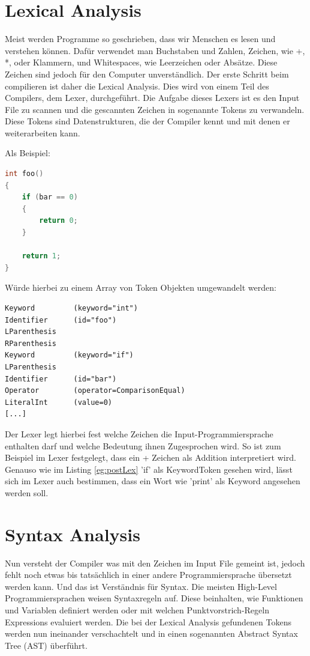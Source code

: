 \section{Lexical Analysis}
Meist werden Programme so geschrieben, dass wir Menschen es lesen und verstehen können. Dafür verwendet man Buchstaben und Zahlen, Zeichen, wie +, *, oder Klammern, und Whitespaces, wie Leerzeichen oder Absätze.
Diese Zeichen sind jedoch für den Computer unverständlich. Der erste Schritt beim compilieren ist daher die Lexical Analysis. Dies wird von einem Teil des Compilers, dem Lexer, durchgeführt.
Die Aufgabe dieses Lexers ist es den Input File zu scannen und die gescannten Zeichen in sogenannte Tokens zu verwandeln. Diese Tokens sind Datenstrukturen, die der Compiler kennt und mit denen er weiterarbeiten kann.

Als Beispiel:

\begin{lstlisting}[language=C, label=eg:preLex, caption=C code vor Lexical Analysis]
int foo()
{
    if (bar == 0)
    {
        return 0;
    }

    return 1;
}
\end{lstlisting}

Würde hierbei zu einem Array von Token Objekten umgewandelt werden:

\begin{lstlisting}[label=eg:postLex, caption=Tokens nach Lexical Analysis]
Keyword         (keyword="int")
Identifier      (id="foo")
LParenthesis
RParenthesis
Keyword         (keyword="if")
LParenthesis
Identifier      (id="bar")
Operator        (operator=ComparisonEqual)
LiteralInt      (value=0)
[...]
\end{lstlisting}

Der Lexer legt hierbei fest welche Zeichen die Input-Programmiersprache enthalten darf und welche Bedeutung ihnen Zugesprochen wird. So ist zum Beispiel im Lexer festgelegt, dass ein + Zeichen als Addition interpretiert wird.
Genauso wie im Listing \ref{eg:postLex} 'if' als KeywordToken gesehen wird, lässt sich im Lexer auch bestimmen, dass ein Wort wie 'print' als Keyword angesehen werden soll.

\section{Syntax Analysis}
Nun versteht der Compiler was mit den Zeichen im Input File gemeint ist, jedoch fehlt noch etwas bis tatsächlich in einer andere Programmiersprache übersetzt werden kann. Und das ist Verständnis für Syntax.
Die meisten High-Level Programmiersprachen weisen Syntaxregeln auf. Diese beinhalten, wie Funktionen und Variablen definiert werden oder mit welchen Punktvorstrich-Regeln Expressions evaluiert werden.
Die bei der Lexical Analysis gefundenen Tokens werden nun ineinander verschachtelt und in einen sogenannten Abstract Syntax Tree (AST) überführt.

